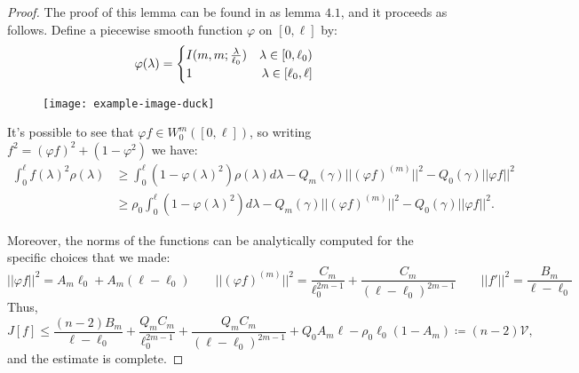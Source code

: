 \begin{proof}
	The proof of this lemma can be found in \cite{fewster2020new} as lemma \(4.1\), and it proceeds as follows. Define a piecewise smooth function \(\varphi\) on \([0,\ell]\) by:
	\[
	\varphi(\lambda) = 
	\begin{cases}
		I(m, m;\frac{\lambda}{\ell_0}) \quad \hfill \lambda \in [0, \ell_0) \\
		1 \hfill \lambda \in [\ell_0, \ell]
	\end{cases}	
	\]

	\begin{figure}
		\centering
		\texttt{[image: example-image-duck]}
	\end{figure}
	
	It's possible to see that \(\varphi f \in W_0^m([0,\ell])\), so writing \(f^2 = (\varphi f)^2 + (1 - \varphi^2)\) we have:
	\begin{align*}
		\int_0^{\ell} f(\lambda)^2\rho(\lambda) &\ge \int_0^{\ell} (1 - \varphi(\lambda)^2)\rho(\lambda)d\lambda - Q_m(\gamma) \vert\vert (\varphi f)^{(m)}\vert\vert^2 - Q_0(\gamma) \vert\vert \varphi f\vert\vert^2 \\
		&\ge  \rho_0\int_0^{\ell} (1 - \varphi(\lambda)^2)d\lambda - Q_m(\gamma) \vert\vert (\varphi f)^{(m)}\vert\vert^2 - Q_0(\gamma) \vert\vert \varphi f\vert\vert^2.
	\end{align*}

	Moreover, the norms of the functions can be analytically computed for the specific choices that we made:
	\[
		\vert\vert \varphi f\vert\vert^2 = A_m\ell_0 + A_m(\ell - \ell_0)\quad\quad
		\vert\vert (\varphi f)^{(m)}\vert\vert^2 = \frac{C_m}{\ell_0^{2m - 1}} + \frac{C_m}{(\ell - \ell_0)^{2m - 1}}
		\quad\quad 
		\vert\vert f'\vert\vert^2 = \frac{B_m}{\ell - \ell_0}
	\]
	Thus,
	\[
		J[f] \le \frac{(n - 2)B_m}{\ell - \ell_0} + \frac{Q_mC_m}{\ell_0^{2m - 1}} + \frac{Q_mC_m}{(\ell - \ell_0)^{2m - 1}} + Q_0A_m\ell - \rho_0\ell_0(1 - A_m) \coloneqq (n-2)\mathcal{V},
	\]
	and the estimate is complete.
\end{proof}

